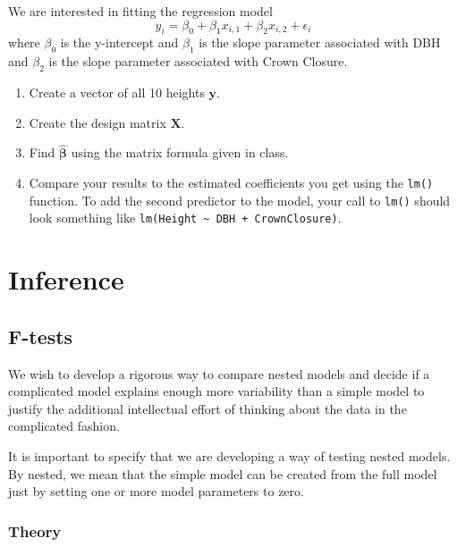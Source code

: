 \documentclass[]{book}
\providecommand{\tightlist}{%
  \setlength{\itemsep}{0pt}\setlength{\parskip}{0pt}}
\theoremstyle{definition}
\theoremstyle{definition}
\theoremstyle{remark}
\begin{document}
\begin{enumerate}
  We are interested in fitting the regression model
  \[y_{i}=\beta_{0}+\beta_{1}x_{i,1}+\beta_{2}x_{i,2}+\epsilon_{i}\]
  where \(\beta_{0}\) is the y-intercept and \(\beta_{1}\) is the slope
  parameter associated with DBH and \(\beta_{2}\) is the slope parameter
  associated with Crown Closure.

  \begin{enumerate}
  \def\labelenumii{\alph{enumii})}
  \tightlist
  \item
    Create a vector of all 10 heights \(\mathbf{y}\).
  \item
    Create the design matrix \(\mathbf{X}\).
  \item
    Find \(\hat{\boldsymbol{\beta}}\) using the matrix formula given in
    class.
  \item
    Compare your results to the estimated coefficients you get using the
    \texttt{lm()} function. To add the second predictor to the model,
    your call to \texttt{lm()} should look something like
    \texttt{lm(Height\ \textasciitilde{}\ DBH\ +\ CrownClosure)}.
  \end{enumerate}
\end{enumerate}

\chapter{Inference}\label{inference}

\section{F-tests}\label{f-tests}

We wish to develop a rigorous way to compare nested models and decide if
a complicated model explains enough more variability than a simple model
to justify the additional intellectual effort of thinking about the data
in the complicated fashion.

It is important to specify that we are developing a way of testing
nested models. By nested, we mean that the simple model can be created
from the full model just by setting one or more model parameters to
zero.

\subsection{Theory}\label{theory}
\end{document}
